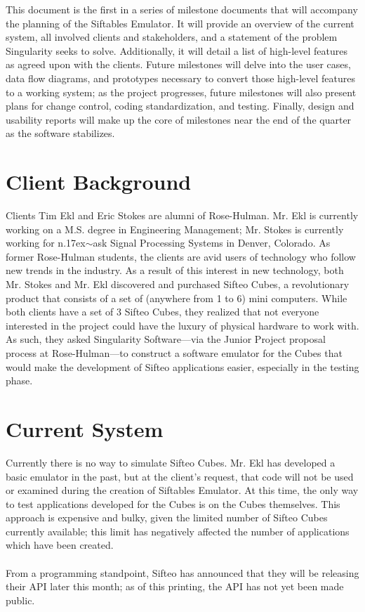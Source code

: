 \documentclass[12pt]{article}
\begin{document}
This document is the first in a series of milestone documents that will accompany the planning of the Siftables Emulator. It will provide an overview of the current system, all involved clients and stakeholders, and a statement of the problem Singularity seeks to solve. Additionally, it will detail a list of high-level features as agreed upon with the clients. Future milestones will delve into the user cases, data flow diagrams, and prototypes necessary to convert those high-level features to a working system; as the project progresses, future milestones will also present plans for change control, coding standardization, and testing. Finally, design and usability reports will make up the core of milestones near the end of the quarter as the software stabilizes.

\section{Client Background}
Clients Tim Ekl and Eric Stokes are alumni of Rose-Hulman. Mr. Ekl is currently working on a M.S. degree in Engineering Management; Mr. Stokes is currently working for n{\raise.17ex\hbox{$\scriptstyle\sim$}}ask Signal Processing Systems in Denver, Colorado. As former Rose-Hulman students, the clients are avid users of technology who follow new trends in the industry. As a result of this interest in new technology, both Mr. Stokes and Mr. Ekl discovered and purchased Sifteo Cubes, a revolutionary product that consists of a set of (anywhere from 1 to 6) mini computers. While both clients have a set of 3 Sifteo Cubes, they realized that not everyone interested in the project could have the luxury of physical hardware to work with. As such, they asked Singularity Software---via the Junior Project proposal process at Rose-Hulman---to construct a software emulator for the Cubes that would make the development of Sifteo applications easier, especially in the testing phase.

\section{Current System}
Currently there is no way to simulate Sifteo Cubes. Mr. Ekl has developed a basic emulator in the past, but at the client's request, that code will not be used or examined during the creation of Siftables Emulator. At this time, the only way to test applications developed for the Cubes is on the Cubes themselves. This approach is expensive and bulky, given the limited number of Sifteo Cubes currently available; this limit has negatively affected the number of applications which have been created.\\\\
From a programming standpoint, Sifteo has announced that they will be releasing their \gls{API} later this month; as of this printing, the \gls{API} has not yet been made public.
\end{document}
